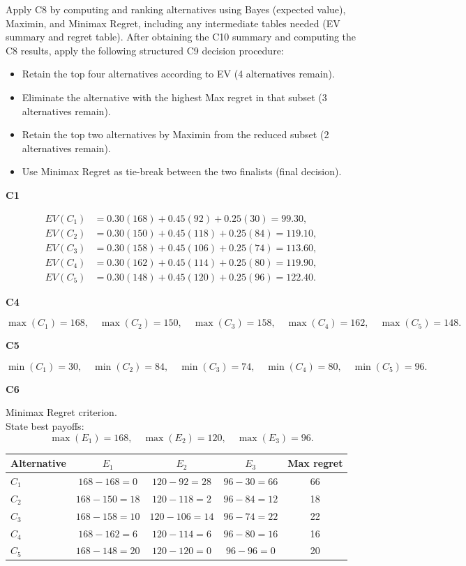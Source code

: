 \begin{ExamProblems}
		Apply C8 by computing and ranking alternatives using Bayes (expected value), Maximin, and Minimax Regret, including any intermediate tables needed (EV summary and regret table).
		After obtaining the C10 summary and computing the C8 results, apply the following structured C9 decision procedure:
		\begin{itemize}
			\item Retain the top four alternatives according to EV (4 alternatives remain).
			\item Eliminate the alternative with the highest Max regret in that subset (3 alternatives remain).
			\item Retain the top two alternatives by Maximin from the reduced subset (2 alternatives remain).
			\item Use Minimax Regret as tie-break between the two finalists (final decision).
		\end{itemize}
		
		\vspace{0.25cm}
		
		\textbf{C1}\par
				\[
		\begin{aligned}
			EV(C_1)&=0.30(168)+0.45(92)+0.25(30)=99.30,\\
			EV(C_2)&=0.30(150)+0.45(118)+0.25(84)=119.10,\\
			EV(C_3)&=0.30(158)+0.45(106)+0.25(74)=113.60,\\
			EV(C_4)&=0.30(162)+0.45(114)+0.25(80)=119.90,\\
			EV(C_5)&=0.30(148)+0.45(120)+0.25(96)=122.40.
		\end{aligned}
		\]
		

		\textbf{C4}\par
				\[
		\max(C_1)=168,\quad \max(C_2)=150,\quad \max(C_3)=158,\quad \max(C_4)=162,\quad \max(C_5)=148.
		\]
		

		\textbf{C5}\par
				\[
		\min(C_1)=30,\quad \min(C_2)=84,\quad \min(C_3)=74,\quad \min(C_4)=80,\quad \min(C_5)=96.
		\]
		


		\textbf{C6}\par
		Minimax Regret criterion.\\
				State best payoffs:
		\[
		\max(E_1)=168,\quad \max(E_2)=120,\quad \max(E_3)=96.
		\]
		\begin{center}
			\begin{tabular}{l c c c c}
				\toprule
				Alternative & $E_1$ & $E_2$ & $E_3$ & Max regret \\
				\midrule
				$C_1$ & $168-168=0$ & $120-92=28$ & $96-30=66$ & 66 \\
				$C_2$ & $168-150=18$ & $120-118=2$ & $96-84=12$ & 18 \\
				$C_3$ & $168-158=10$ & $120-106=14$ & $96-74=22$ & 22 \\
				$C_4$ & $168-162=6$ & $120-114=6$ & $96-80=16$ & 16 \\
				$C_5$ & $168-148=20$ & $120-120=0$ & $96-96=0$ & 20 \\
				\bottomrule
			\end{tabular}
		\end{center}
		


\end{ExamProblems}
